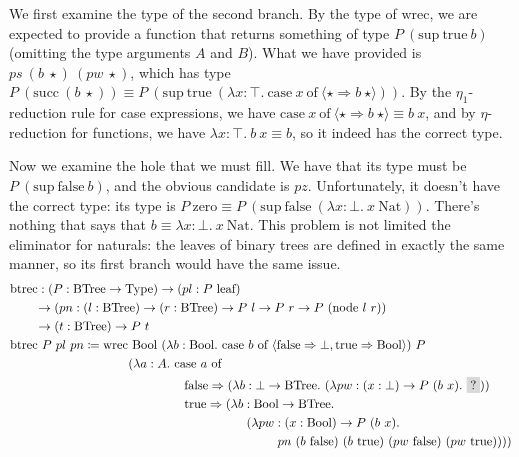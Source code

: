 \documentclass{report}
\newcommand{\Nat}{\const{Nat}}
\newcommand{\zero}{\const{zero}}
\renewcommand{\succ}{\const{succ}}
\newcommand{\BTree}{\const{BTree}}
\newcommand{\leaf}{\const{leaf}}
\newcommand{\node}{\const{node}}
\newcommand{\Bool}{\const{Bool}}
\newcommand{\true}{\const{true}}
\newcommand{\false}{\const{false}}
\renewcommand{\sup}{\const{sup}}
\newcommand{\const}[1]{\text{#1}}
\newcommand{\hole}{\colorbox{gray!30}{?}}
\newcommand{\Type}{\const{Type}}
\newcommand{\case}{\const{case}}
\newcommand{\of}{\const{of}}
\begin{document}
We first examine the type of the second branch. By the type of $\const{wrec}$, we are expected to provide a function that returns something of type $P ~ (\sup ~ \true ~ b)$ (omitting the type arguments $A$ and $B$). What we have provided is $ps ~ (b ~ \star) ~ (pw ~ \star)$, which has type $P ~ (\succ ~ (b ~ \star)) \equiv P ~ (\sup ~ \true ~ (\lambda x: \top. ~ \case ~ x ~ \of ~ \langle \star \Rightarrow b ~ \star \rangle))$. By the $\eta_1$-reduction rule for case expressions, we have $\case ~ x ~ \of ~ \langle \star \Rightarrow b ~ \star \rangle \equiv b ~ x$, and by $\eta$-reduction for functions, we have $\lambda x: \top. ~ b ~ x \equiv b$, so it indeed has the correct type.

Now we examine the hole that we must fill. We have that its type must be $P ~ (\sup ~ \false ~ b)$, and the obvious candidate is $pz$. Unfortunately, it doesn't have the correct type: its type is $P ~ \zero \equiv P ~ (\sup ~ \false ~ (\lambda x: \bot. ~ x ~ \Nat))$. There's nothing that says that $b \equiv \lambda x: \bot. ~ x ~ \Nat$. This problem is not limited the eliminator for naturals: the leaves of binary trees are defined in exactly the same manner, so its first branch would have the same issue.
%
\begin{align*}
    &\const{btrec}: (P: \BTree \to \Type) \to (pl: P ~ \leaf) \\
    &\qquad\to (pn: (l: \BTree) \to (r: \BTree) \to P ~ l \to P ~ r \to P ~ (\node ~ l ~ r)) \\
    &\qquad\to (t: \BTree) \to P ~ t \\
    &\const{btrec} ~ P ~ pl ~ pn \coloneqq \const{wrec} ~ \Bool ~ (\lambda b: \Bool. ~ \case ~ b ~ \of ~ \langle \false \Rightarrow \bot, \true \Rightarrow \Bool \rangle) ~ P \\
    &\hspace{9.5em} (\lambda a: A. ~ \case ~ a ~ \of \\
    &\hspace{14em} \false \Rightarrow (\lambda b: \bot \to \BTree. ~ (\lambda pw: (x: \bot) \to P ~ (b ~ x). ~ \hole)) \\
    &\hspace{14em} \true \Rightarrow (\lambda b: \Bool \to \BTree. ~ \\
    &\hspace{19em} (\lambda pw: (x: \Bool) \to P ~ (b ~ x). \\
    &\hspace{21.5em} pn ~ (b ~ \false) ~ (b ~ \true) ~ (pw ~ \false) ~ (pw ~ \true))))
\end{align*}
\end{document}
